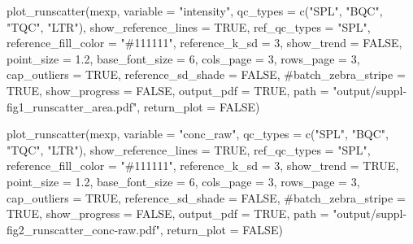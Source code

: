 \documentclass[
  letterpaper,
  DIV=11,
  numbers=noendperiod]{scrartcl}
\newenvironment{Shaded}{\begin{snugshade}}{\end{snugshade}}
\newcommand{\AttributeTok}[1]{\textcolor[rgb]{0.40,0.45,0.13}{#1}}
\newcommand{\CommentTok}[1]{\textcolor[rgb]{0.37,0.37,0.37}{#1}}
\newcommand{\ConstantTok}[1]{\textcolor[rgb]{0.56,0.35,0.01}{#1}}
\newcommand{\DecValTok}[1]{\textcolor[rgb]{0.68,0.00,0.00}{#1}}
\newcommand{\FloatTok}[1]{\textcolor[rgb]{0.68,0.00,0.00}{#1}}
\newcommand{\FunctionTok}[1]{\textcolor[rgb]{0.28,0.35,0.67}{#1}}
\newcommand{\NormalTok}[1]{\textcolor[rgb]{0.00,0.23,0.31}{#1}}
\newcommand{\StringTok}[1]{\textcolor[rgb]{0.13,0.47,0.30}{#1}}
\begin{document}
\begin{Shaded}
\begin{Highlighting}[]
\FunctionTok{plot\_runscatter}\NormalTok{(mexp, }
  \AttributeTok{variable =} \StringTok{"intensity"}\NormalTok{, }
  \AttributeTok{qc\_types =} \FunctionTok{c}\NormalTok{(}\StringTok{"SPL"}\NormalTok{, }\StringTok{"BQC"}\NormalTok{, }\StringTok{"TQC"}\NormalTok{, }\StringTok{"LTR"}\NormalTok{), }
  \AttributeTok{show\_reference\_lines =} \ConstantTok{TRUE}\NormalTok{,}
  \AttributeTok{ref\_qc\_types =} \StringTok{"SPL"}\NormalTok{,}
  \AttributeTok{reference\_fill\_color =} \StringTok{"\#111111"}\NormalTok{,}
  \AttributeTok{reference\_k\_sd =} \DecValTok{3}\NormalTok{,}
  \AttributeTok{show\_trend =} \ConstantTok{FALSE}\NormalTok{,}
  \AttributeTok{point\_size =} \FloatTok{1.2}\NormalTok{,}
  \AttributeTok{base\_font\_size =} \DecValTok{6}\NormalTok{,}
  \AttributeTok{cols\_page =} \DecValTok{3}\NormalTok{,}
  \AttributeTok{rows\_page =} \DecValTok{3}\NormalTok{,}
  \AttributeTok{cap\_outliers =} \ConstantTok{TRUE}\NormalTok{,}
  \AttributeTok{reference\_sd\_shade =} \ConstantTok{FALSE}\NormalTok{,}
  \CommentTok{\#batch\_zebra\_stripe = TRUE, }
  \AttributeTok{show\_progress =} \ConstantTok{FALSE}\NormalTok{,}
  \AttributeTok{output\_pdf =} \ConstantTok{TRUE}\NormalTok{,}
  \AttributeTok{path =} \StringTok{"output/suppl{-}fig1\_runscatter\_area.pdf"}\NormalTok{, }\AttributeTok{return\_plot =} \ConstantTok{FALSE}\NormalTok{)}

\FunctionTok{plot\_runscatter}\NormalTok{(mexp, }
  \AttributeTok{variable =} \StringTok{"conc\_raw"}\NormalTok{, }
  \AttributeTok{qc\_types =} \FunctionTok{c}\NormalTok{(}\StringTok{"SPL"}\NormalTok{, }\StringTok{"BQC"}\NormalTok{, }\StringTok{"TQC"}\NormalTok{, }\StringTok{"LTR"}\NormalTok{), }
  \AttributeTok{show\_reference\_lines =} \ConstantTok{TRUE}\NormalTok{,}
  \AttributeTok{ref\_qc\_types =} \StringTok{"SPL"}\NormalTok{,}
  \AttributeTok{reference\_fill\_color =} \StringTok{"\#111111"}\NormalTok{,}
  \AttributeTok{reference\_k\_sd =} \DecValTok{3}\NormalTok{,}
  \AttributeTok{show\_trend =} \ConstantTok{TRUE}\NormalTok{,}
  \AttributeTok{point\_size =} \FloatTok{1.2}\NormalTok{,}
  \AttributeTok{base\_font\_size =} \DecValTok{6}\NormalTok{,}
  \AttributeTok{cols\_page =} \DecValTok{3}\NormalTok{,}
  \AttributeTok{rows\_page =} \DecValTok{3}\NormalTok{,}
  \AttributeTok{cap\_outliers =} \ConstantTok{TRUE}\NormalTok{,}
  \AttributeTok{reference\_sd\_shade =} \ConstantTok{FALSE}\NormalTok{,}
  \CommentTok{\#batch\_zebra\_stripe = TRUE,}
  \AttributeTok{show\_progress =} \ConstantTok{FALSE}\NormalTok{, }
  \AttributeTok{output\_pdf =} \ConstantTok{TRUE}\NormalTok{,}
  \AttributeTok{path =} \StringTok{"output/suppl{-}fig2\_runscatter\_conc{-}raw.pdf"}\NormalTok{, }\AttributeTok{return\_plot =} \ConstantTok{FALSE}\NormalTok{)}


\end{Highlighting}
\end{Shaded}
\end{document}
